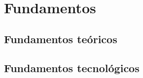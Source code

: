 \chapter{Fundamentos}
\label{chap:fundamentos}



\section{Fundamentos teóricos}
\label{sec:fundamentos_teoricos}







\section{Fundamentos tecnológicos}
\label{sec:fundamentos_tecnologicos}




